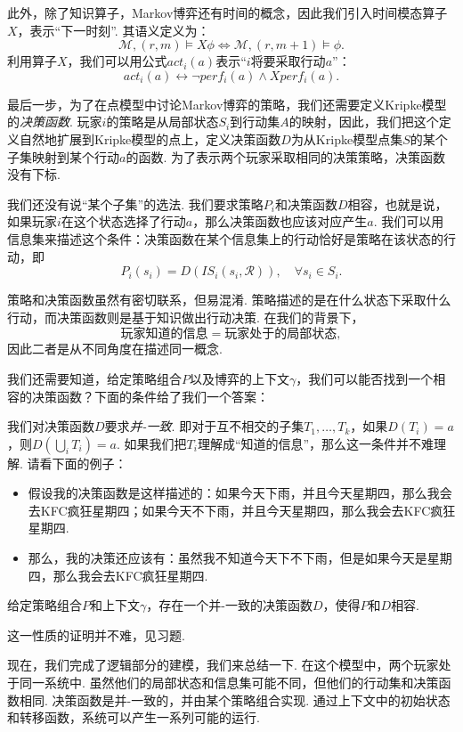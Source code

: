 此外，除了知识算子，Markov博弈还有时间的概念，因此我们引入时间模态算子$X$，表示“下一时刻”. 其语义定义为：
\[
\mathcal{M}, (r, m) \vDash X\phi \iff \mathcal{M}, (r, m+1) \vDash \phi.
\]
利用算子$X$，我们可以用公式$act_i(a)$表示“$i$将要采取行动$a$”：
\[act_i(a) \leftrightarrow \neg perf_i(a) \wedge X perf_i(a).\]

最后一步，为了在点模型中讨论Markov博弈的策略，我们还需要定义Kripke模型的\textit{决策函数}. 玩家$i$的策略是从局部状态$S_i$到行动集$A$的映射，因此，我们把这个定义自然地扩展到Kripke模型的点上，定义决策函数$D$为从Kripke模型点集$S$的某个子集映射到某个行动$a$的函数. 为了表示两个玩家采取相同的决策策略，决策函数没有下标. 

我们还没有说“某个子集”的选法. 我们要求策略$P_i$和决策函数$D$相容，也就是说，如果玩家$i$在这个状态选择了行动$a$，那么决策函数也应该对应产生$a$. 我们可以用信息集来描述这个条件：决策函数在某个信息集上的行动恰好是策略在该状态的行动，即
\[
P_i(s_i) = D(IS_i(s_i, \mathcal{R})), \quad \forall s_i \in S_i.
\]

策略和决策函数虽然有密切联系，但易混淆. 策略描述的是在什么状态下采取什么行动，而决策函数则是基于知识做出行动决策. 在我们的背景下，
    \[\text{玩家知道的信息}=\text{玩家处于的局部状态},\]
因此二者是从不同角度在描述同一概念. 

我们还需要知道，给定策略组合$P$以及博弈的上下文$\gamma$，我们可以能否找到一个相容的决策函数？下面的条件给了我们一个答案：

我们对决策函数$D$要求\textit{并-一致}. 即对于互不相交的子集$T_1, \dots, T_k$，如果$D(T_i) = a$，则$D(\bigcup_i T_i) = a$. 如果我们把$T_i$理解成“知道的信息”，那么这一条件并不难理解. 请看下面的例子：
\begin{itemize}
    \item 假设我的决策函数是这样描述的：如果今天下雨，并且今天星期四，那么我会去KFC疯狂星期四；如果今天不下雨，并且今天星期四，那么我会去KFC疯狂星期四.
    \item 那么，我的决策还应该有：虽然我不知道今天下不下雨，但是如果今天是星期四，那么我会去KFC疯狂星期四.
\end{itemize}

\begin{proposition}\label{prop:consistent-decision}
    给定策略组合$P$和上下文$\gamma$，存在一个并-一致的决策函数$D$，使得$P$和$D$相容. 
\end{proposition}

这一性质的证明并不难，见习题. 

现在，我们完成了逻辑部分的建模，我们来总结一下. 在这个模型中，两个玩家处于同一系统中. 虽然他们的局部状态和信息集可能不同，但他们的行动集和决策函数相同. 决策函数是并-一致的，并由某个策略组合实现. 通过上下文中的初始状态和转移函数，系统可以产生一系列可能的运行. 

